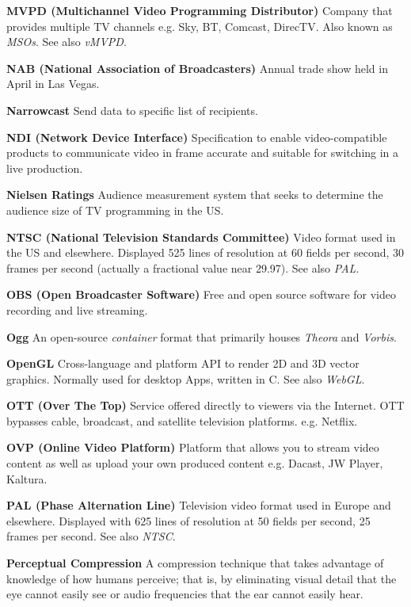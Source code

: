 \smallskip
\textbf{MVPD (Multichannel Video Programming Distributor)}
Company that provides multiple TV channels e.g. Sky, BT, Comcast, DirecTV. Also known as \textit{MSOs}. See also \textit{vMVPD}.

\smallskip
\textbf{NAB (National Association of Broadcasters)}
Annual trade show held in April in Las Vegas.

\smallskip
\textbf{Narrowcast}
Send data to specific list of recipients.

\smallskip
\textbf{NDI (Network Device Interface)}
Specification to enable video-compatible products to communicate video in frame accurate and suitable for switching in a live production.

\smallskip
\textbf{Nielsen Ratings}
Audience measurement system that seeks to determine the audience size of TV programming in the US.

\smallskip
\textbf{NTSC (National Television Standards Committee)}
Video format used in the US and elsewhere. Displayed 525 lines of resolution at 60 fields per second, 30 frames per second (actually a fractional value near 29.97). See also \textit{PAL}.

\smallskip
\textbf{OBS (Open Broadcaster Software)}
Free and open source software for video recording and live streaming.

\smallskip
\textbf{Ogg}
An open-source \textit{container} format that primarily houses \textit{Theora} and \textit{Vorbis}.

\smallskip
\textbf{OpenGL}
Cross-language and platform API to render 2D and 3D vector graphics.  Normally used for desktop Apps, written in C. See also \textit{WebGL}.

\smallskip
\textbf{OTT (Over The Top)}
Service offered directly to viewers via the Internet. OTT bypasses cable, broadcast, and satellite television platforms. e.g. Netflix.

\smallskip
\textbf{OVP (Online Video Platform)}
Platform that allows you to stream video content as well as upload your own produced content e.g. Dacast, JW Player, Kaltura.

\smallskip
\textbf{PAL (Phase Alternation Line)}
Television video format used in Europe and elsewhere. Displayed with 625 lines of resolution at 50 fields per second, 25 frames per second. See also \textit{NTSC}.

\smallskip
\textbf{Perceptual Compression}
A compression technique that takes advantage of knowledge of how humans perceive; that is, by eliminating visual detail that the eye cannot easily see or audio frequencies that the ear cannot easily hear.

